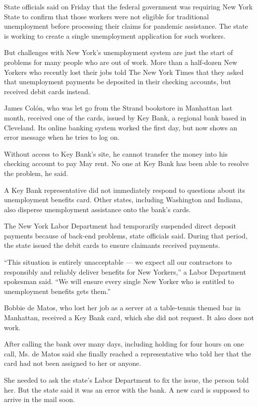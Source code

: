 State officials said on Friday that the federal government was requiring
New York State to confirm that those workers were not eligible for
traditional unemployment before processing their claims for pandemic
assistance. The state is working to create a single unemployment
application for such workers.

But challenges with New York's unemployment system are just the start of
problems for many people who are out of work. More than a half-dozen New
Yorkers who recently lost their jobs told The New York Times that they
asked that unemployment payments be deposited in their checking
accounts, but received debit cards instead.

James Colón, who was let go from the Strand bookstore in Manhattan last
month, received one of the cards, issued by Key Bank, a regional bank
based in Cleveland. Its online banking system worked the first day, but
now shows an error message when he tries to log on.

Without access to Key Bank's site, he cannot transfer the money into his
checking account to pay May rent. No one at Key Bank has been able to
resolve the problem, he said.

A Key Bank representative did not immediately respond to questions about
its unemployment benefits card. Other states, including Washington and
Indiana, also disperse unemployment assistance onto the bank's cards.

The New York Labor Department had temporarily suspended direct deposit
payments because of back-end problems, state officials said. During that
period, the state issued the debit cards to ensure claimants received
payments.

``This situation is entirely unacceptable --- we expect all our
contractors to responsibly and reliably deliver benefits for New
Yorkers,'' a Labor Department spokesman said. ``We will ensure every
single New Yorker who is entitled to unemployment benefits gets them.''

Bobbie de Matos, who lost her job as a server at a table-tennis themed
bar in Manhattan, received a Key Bank card, which she did not request.
It also does not work.

After calling the bank over many days, including holding for four hours
on one call, Ms. de Matos said she finally reached a representative who
told her that the card had not been assigned to her or anyone.

She needed to ask the state's Labor Department to fix the issue, the
person told her. But the state said it was an error with the bank. A new
card is supposed to arrive in the mail soon.

